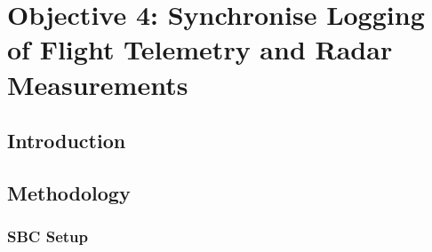 \section{Objective 4: Synchronise Logging of Flight Telemetry and Radar Measurements}

\subsection{Introduction}

\subsection{Methodology}



\subsubsection{SBC Setup}

